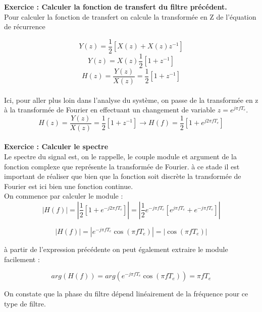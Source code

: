 \documentclass[11pt,a4paper]{article}
\begin{document}
\textbf{Exercice : Calculer la fonction de transfert du filtre précédent. }\\

Pour calculer la fonction de transfert on calcule la transformée en Z de l'équation de récurrence 

\[ Y(z) = \frac{1}{2}[X(z) + X(z)z^{-1}  ] \]
\[ Y(z) = X(z)\frac{1}{2}[1 + z^{-1}  ] \]
\[ H(z) = \frac{Y(z)}{X(z)} = \frac{1}{2}[1 + z^{-1}  ] \]\\

Ici, pour aller plus loin dans l'analyse du système, on passe de la transformée en z à la transformée de Fourier  en effectuant un changement de variable $z = e^{j\pi f T_e}$. \\

\[ H(z) = \frac{Y(z)}{X(z)} = \frac{1}{2}[1 + z^{-1}  ] \rightarrow H(f) = \frac{1}{2}[1 + e^{j2\pi f T_e}]\]\\

\textbf{Exercice : Calculer le spectre}\\

Le spectre du signal est, on le  rappelle, le couple module et argument de la fonction complexe que représente la transformée de  Fourier. à ce stade il est important de réaliser que bien que la fonction soit discrète la transformée de Fourier est ici bien une fonction continue.\\

On commence par calculer le module :\\

\[ |H(f)| = |\frac{1}{2}[1 + e^{-j2\pi f T_e}]| = |\frac{1}{2}e^{-j\pi f T_e}[e^{j\pi f T_e} + e^{-j\pi f T_e}]|   \]

\[ |H(f)| = |e^{-j\pi f T_e}\cos(\pi f T_e)|  = |\cos(\pi f T_e)|   \]

à partir de l'expression précédente on peut également extraire le module facilement : 

\[ arg(H(f)) = arg(e^{-j\pi f T_e}\cos(\pi f T_e)) = \pi f T_e\]

On constate que la phase du filtre dépend linéairement de la fréquence pour  ce type de filtre.

\begin{center}
\end{center}
\end{document}
